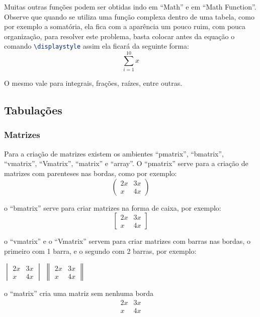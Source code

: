 Muitas outras funções podem ser obtidas indo em ``Math'' e em ``Math Function''. Observe que quando se utiliza uma função complexa dentro de uma tabela, como por exemplo a somatória, ela fica com a aparência um pouco ruim, com pouca organização, para resolver este problema, basta colocar antes da equação o comando \lstinline[language=TeX]|\displaystyle| assim ela ficará da seguinte forma:
\[
\sum_{i=1}^{10}{x}
\]

O mesmo vale para integrais, frações, raízes, entre outras.
\subsection{Tabulações}
\subsubsection{Matrizes}
Para a criação de matrizes existem os ambientes ``pmatrix'', ``bmatrix'', ``vmatrix'', ``Vmatrix'', ``matrix'' e ``array''. O ``pmatrix'' serve para a criação de matrizes com parenteses nas bordas, como por exemplo:
\[
\begin{pmatrix}
	2x & 3x \\ 
	x & 4x
\end{pmatrix} 
\]

o ``bmatrix'' serve para criar matrizes na forma de caixa, por exemplo:
\[
\begin{bmatrix}
2x & 3x \\ 
x & 4x
\end{bmatrix} 
\]

o ``vmatrix'' e o ``Vmatrix'' servem para criar matrizes com barras nas bordas, o primeiro com 1 barra, e o segundo com 2 barras, por exemplo: \\
\begin{center}
$
\begin{vmatrix}
2x & 3x \\ 
x & 4x
\end{vmatrix} 
$
\hspace*{2cm}
$
\begin{Vmatrix}
2x & 3x \\ 
x & 4x
\end{Vmatrix} 
$
\end{center}

o ``matrix'' cria uma matriz sem nenhuma borda
\[
\begin{matrix}
2x & 3x \\ 
x & 4x
\end{matrix}
\]

